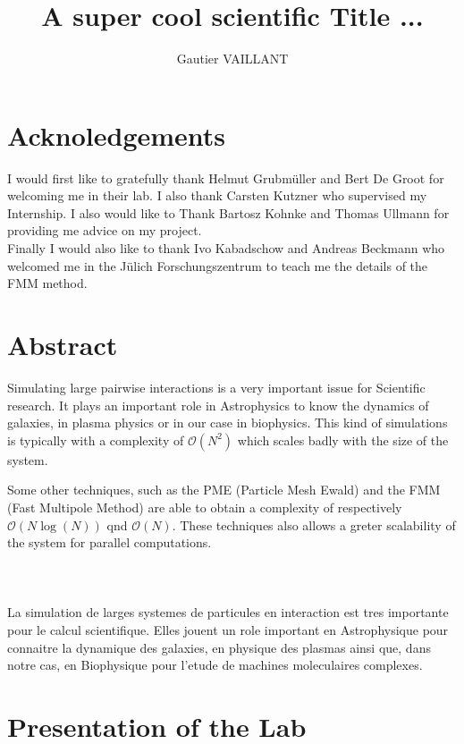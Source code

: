 \documentclass[12pt,twoside,a4paper]{report}
\title{A super cool scientific Title ...}
\author{Gautier VAILLANT}
\begin{document}
\maketitle

\chapter*{Acknoledgements}

I would first like to gratefully thank Helmut Grubmüller and Bert De Groot for welcoming me in their lab. I also thank Carsten Kutzner who supervised my Internship. I also would like to Thank Bartosz Kohnke and Thomas Ullmann for providing me advice on my project.\\ 

Finally I would also like to thank Ivo Kabadschow and Andreas Beckmann who welcomed me in the Jülich Forschungszentrum to teach me the details of the FMM method. 


\chapter*{Abstract}

Simulating large pairwise interactions is a very important issue for Scientific research. It plays an important role in Astrophysics to know the dynamics of galaxies, in plasma physics or in our case in biophysics. This kind of simulations is typically with a complexity of $\mathcal{O}(N^2)$ which scales badly with the size of the system.

Some other techniques, such as the PME (Particle Mesh Ewald) and the FMM (Fast Multipole Method) are able to obtain a complexity of respectively $\mathcal{O}(N\log(N))$ qnd $\mathcal{O}(N)$. These techniques also allows a greter scalability of the system for parallel computations.
\\
\\
\\
\\

	La simulation de larges systemes de particules en interaction est tres importante pour le calcul scientifique. Elles jouent un role important en Astrophysique pour connaitre la dynamique des galaxies, en physique des plasmas ainsi que, dans notre cas, en Biophysique pour l'etude de machines moleculaires complexes.
	
\tableofcontents

\chapter{Presentation of the Lab}
\end{document}
